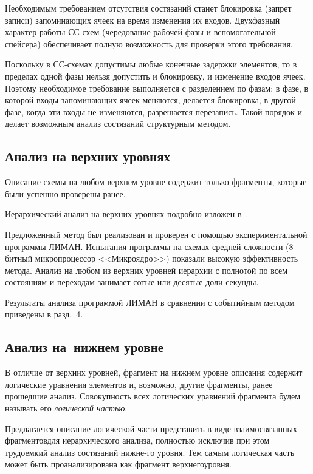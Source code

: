 \begin{multicols}{2}
  Необходимым требованием отсутствия состязаний станет блокировка (запрет
записи) запоминающих ячеек на время изменения их входов. Двухфазный
характер работы СС-схем (чередование \mbox{рабочей} фазы и вспомогательной~---
спейсера) обеспечивает полную возможность для проверки этого требования.

  Поскольку в СС-схе\-мах допустимы любые конечные задержки элементов, то
в пределах одной фазы нельзя допустить и блокировку, и изменение входов
ячеек. Поэтому необходимое требование выполняется с разделением по фазам: в
фазе, в которой входы запоминающих ячеек меняются, делается блокировка, в
другой фазе, когда эти входы не изменяются, разрешается перезапись. Такой
порядок и делает возможным анализ состязаний структурным методом.

\subsection{Анализ на верхних уровнях}

  Описание схемы на любом верхнем уровне содержит только фрагменты,
которые были успешно проверены ранее.

  Иерархический анализ на верхних уровнях подробно изложен
  в~\cite{5-p, 16-p}.

  Предложенный метод был реализован и проверен с помощью
экспериментальной программы ЛИМАН. Испытания программы на схемах
средней сложности (8-бит\-ный микропроцессор <<Мик\-ро\-ядро>>) показали
высокую эффективность метода. Анализ на любом из верхних уровней иерархии
с полнотой по всем состояниям и переходам занимает сотые или десятые доли
секунды.

  Результаты анализа программой ЛИМАН в сравнении с событийным методом
приведены в разд.~4.

\subsection{Анализ на~нижнем уровне}

  В отличие от верхних уровней, фрагмент на нижнем уровне описания
содержит логические уравнения элементов и, возможно, другие фрагменты,
ранее прошедшие анализ. Совокупность всех логических уравнений фрагмента
будем называть его \textit{логической частью}.

  Предлагается описание логической части представить в виде
взаимосвязанных фрагментов\linebreak для иерархического анализа, полностью исключив
при этом трудоемкий анализ состязаний нижне-\linebreak го уровня. Тем самым логическая
часть может быть проанализирована как фрагмент верхнего\linebreak уровня.
{ %

}
\end{multicols}
